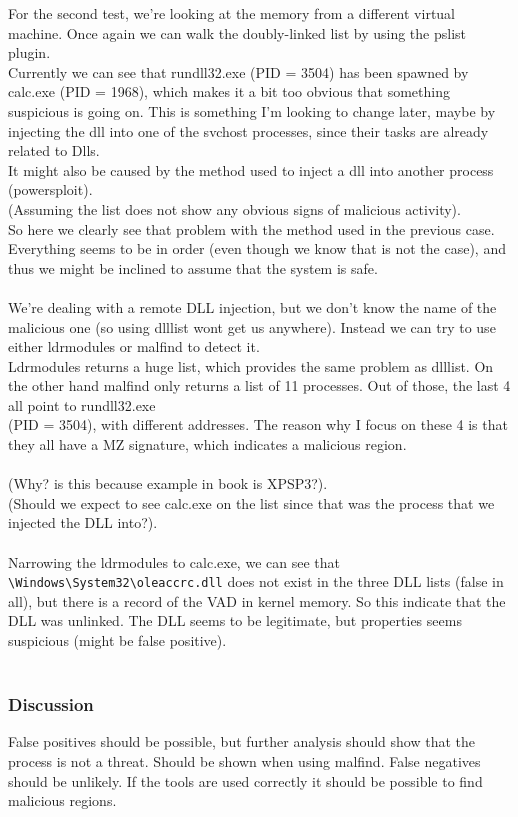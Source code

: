 \documentclass[a4paper]{article}
\begin{document}
For the second test, we're looking at the memory from a different virtual machine. Once again we
can walk the doubly-linked list by using the pslist plugin. \\
Currently we can see that rundll32.exe (PID = 3504) has been spawned by calc.exe (PID = 1968),
which makes it a bit too obvious that something suspicious is going on. This is something I'm
looking to change later, maybe by injecting the dll into one of the svchost processes, since their
tasks are already related to Dlls. \\
It might also be caused by the method used to inject a dll into another process (powersploit). \\
(Assuming the list does not show any obvious signs of malicious activity). \\
So here we clearly see that problem with the method used in the previous case. Everything seems
to be in order (even though we know that is not the case), and thus we might be inclined to
assume that the system is safe. \\ \\
%
We're dealing with a remote DLL injection, but we don't know the name of the malicious one
(so using dlllist wont get us anywhere). Instead we can try to use either ldrmodules or malfind
to detect it. \\
Ldrmodules returns a huge list, which provides the same problem as dlllist. On the other hand
malfind only returns a list of 11 processes. Out of those, the last 4 all point to rundll32.exe \\
(PID = 3504), with different addresses. The reason why I focus on these 4 is that they all have a MZ
signature, which indicates a malicious region. \\\\
(Why? is this because example in book is XPSP3?). \\
(Should we expect to see calc.exe on the list since that was the process that we injected the DLL into?). \\\\
%
Narrowing the ldrmodules to calc.exe, we can see that \texttt{\textbackslash Windows\textbackslash System32\textbackslash oleaccrc.dll} 
does not exist in the three DLL lists (false in all), but there is a record of the VAD in kernel memory. 
So this indicate that the DLL was unlinked. The DLL seems to be legitimate, but properties seems suspicious (might be false positive). \\\\
%
\subsubsection{Discussion}
False positives should be possible, but further analysis should show that the process is not a threat. Should be shown when using malfind.
False negatives should be unlikely. If the tools are used correctly it should be possible to find malicious regions.
\end{document}
